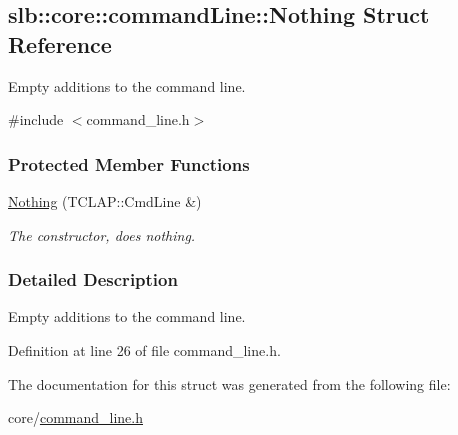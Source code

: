 \hypertarget{structslb_1_1core_1_1commandLine_1_1Nothing}{}\subsection{slb\+:\+:core\+:\+:command\+Line\+:\+:Nothing Struct Reference}
\label{structslb_1_1core_1_1commandLine_1_1Nothing}


Empty additions to the command line.  




{\ttfamily \#include $<$command\+\_\+line.\+h$>$}

\subsubsection*{Protected Member Functions}
\begin{DoxyCompactItemize}
\item 
\hyperlink{structslb_1_1core_1_1commandLine_1_1Nothing_aa236acfd9db82b41acfd0b5a1052eca8}{Nothing} (T\+C\+L\+A\+P\+::\+Cmd\+Line \&)\hypertarget{structslb_1_1core_1_1commandLine_1_1Nothing_aa236acfd9db82b41acfd0b5a1052eca8}{}\label{structslb_1_1core_1_1commandLine_1_1Nothing_aa236acfd9db82b41acfd0b5a1052eca8}

\begin{DoxyCompactList}\small\item\em The constructor, does nothing. \end{DoxyCompactList}\end{DoxyCompactItemize}


\subsubsection{Detailed Description}
Empty additions to the command line. 

Definition at line 26 of file command\+\_\+line.\+h.



The documentation for this struct was generated from the following file\+:\begin{DoxyCompactItemize}
\item 
core/\hyperlink{command__line_8h}{command\+\_\+line.\+h}\end{DoxyCompactItemize}
